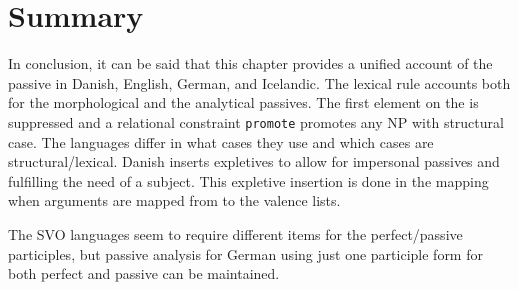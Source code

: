 



\section{Summary}

In conclusion, it can be said that this chapter provides a unified account of the passive in Danish,
English, German, and Icelandic. The lexical rule accounts both for the morphological and the
analytical passives. The first element on the \argstl is suppressed and a relational constraint
\texttt{promote} promotes any NP with structural case. The languages differ in what cases they use and
which cases are structural/lexical. Danish inserts expletives to allow for impersonal passives and
fulfilling the need of a subject. This expletive insertion is done in the \argst mapping when
arguments are mapped from \argst to the valence lists.

The SVO languages seem to require different items for the perfect/passive participles, but 
passive analysis for German using just one participle form for both perfect and passive can be maintained.










